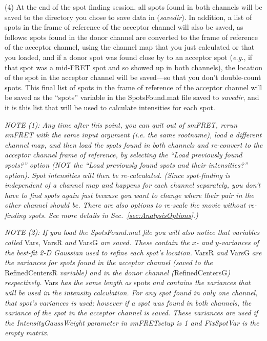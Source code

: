 \documentclass[11pt]{article}
\begin{document}
\noindent (4) At the end of the spot finding session, all spots found in both channels will be saved to the directory you chose to save data in ({\it savedir}).  In addition, a list of spots in the frame of reference of the acceptor channel will also be saved, as follows: spots found in the donor channel are converted to the frame of reference of the acceptor channel, using the channel map that you just calculated or that you loaded, and if a donor spot was found close by to an acceptor spot ({\it e.g.}, if that spot was a mid-FRET spot and so showed up in both channels), the location of the spot in the acceptor channel will be saved---so that you don't double-count spots.  This final list of spots in the frame of reference of the acceptor channel will be saved as the ``spots'' variable in the SpotsFound.mat file saved to {\it savedir}, and it is this list that will be used to calculate intensities for each spot.

{\it NOTE (1): Any time after this point, you can quit out of smFRET, rerun smFRET with the same input argument ({\it i.e.} the same rootname), load a different channel map, and then load the spots found in both channels and re-convert to the acceptor channel frame of reference, by selecting the ``Load previously found spots?'' option (NOT the ``Load previously found spots and their intensities?'' option).  Spot intensities will then be re-calculated. (Since spot-finding is independent of a channel map and happens for each channel separately, you don't have to find spots again just because you want to change where their pair in the other channel should be.  There are also options to re-scale the movie without re-finding spots.  See more details in Sec.~\ref{sec:AnalysisOptions}.)}

{\it NOTE (2): If you load the SpotsFound.mat file you will also notice that variables called} Vars, VarsR {\it and} VarsG {\it are saved.  These contain the $x$- and $y$-variances of the best-fit 2-D Gaussian used to refine each spot's location.}  VarsR {\it and} VarsG {\it are the variances for spots found in the acceptor channel (saved to the} RefinedCentersR {\it variable) and in the donor channel (}RefinedCentersG{\it) respectively. } Vars {\it has the same length as} spots {\it and contains the variances that will be used in the intensity calculation.  For any spot found in only one channel, that spot's variances is used; however if a spot was found in both channels, the variance of the spot in the acceptor channel is saved.  These variances are used if the IntensityGaussWeight parameter in smFRETsetup is 1 and FixSpotVar is the empty matrix.}
\end{document}
